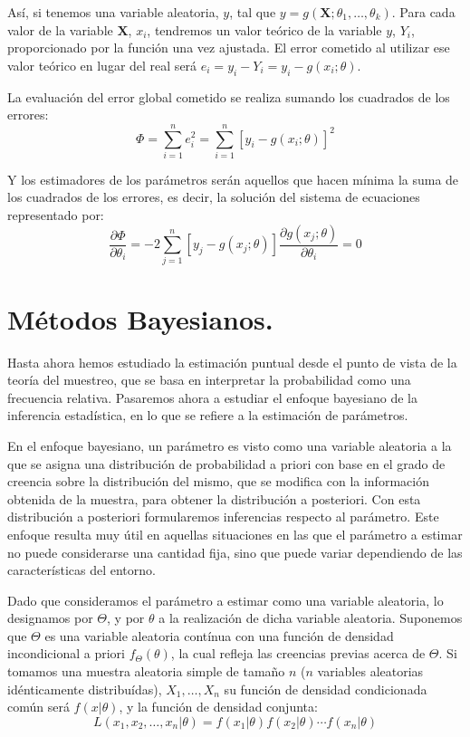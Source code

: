 As\'i, si tenemos una variable aleatoria, $y$, tal que $y=g(\boldsymbol{X};\theta_1,\ldots,\theta_k)$. Para cada valor de la variable $\boldsymbol{X}$, $x_i$, tendremos un valor te\'orico de la variable $y$, $Y_i$, proporcionado por la funci\'on una vez ajustada. El error cometido al utilizar ese valor te\'orico en lugar del real ser\'a $e_i=y_i-Y_i=y_i-g(x_i;\theta)$.

La evaluaci\'on del error global cometido se realiza sumando los cuadrados de los errores:
\begin{equation*}
\Phi=\sum_{i=1}^ne_i^2=\sum_{i=1}^n\left[y_i-g(x_i;\theta)\right]^2
\end{equation*}

Y los estimadores de los par\'ametros ser\'an aquellos que hacen m\'inima la suma de los cuadrados de los errores, es decir, la soluci\'on del sistema de ecuaciones representado por:
\begin{equation*}
\dfrac{\partial\Phi}{\partial\theta_i}=-2\sum_{j=1}^n\left[y_j-g(x_j;\theta)\right]\dfrac{\partial g(x_j;\theta)}{\partial\theta_i}=0
\end{equation*}


\section{M\'etodos Bayesianos.}
Hasta ahora hemos estudiado la estimaci\'on puntual desde el punto de vista de la teor\'ia del muestreo, que se basa en interpretar la probabilidad como una frecuencia relativa. Pasaremos ahora a estudiar el enfoque bayesiano de la inferencia estad\'istica, en lo que se refiere a la estimaci\'on de par\'ametros.

En el enfoque bayesiano, un par\'ametro es visto como una variable aleatoria a la que se asigna una distribuci\'on de probabilidad a priori con base en el grado de creencia sobre la distribuci\'on del mismo, que se modifica con la informaci\'on obtenida de la muestra, para obtener la distribuci\'on a posteriori. Con esta distribuci\'on a posteriori formularemos inferencias respecto al par\'ametro. Este enfoque resulta muy \'util en aquellas situaciones en las que el par\'ametro a estimar no puede considerarse una cantidad fija, sino que puede variar dependiendo de las caracter\'isticas del entorno.

Dado que consideramos el par\'ametro a estimar como una variable aleatoria, lo designamos por $\Theta$, y por $\theta$ a la realizaci\'on de dicha variable aleatoria. Suponemos que $\Theta$ es una variable aleatoria cont\'inua con una funci\'on de densidad incondicional a priori $f_{\Theta}(\theta)$, la cual refleja las creencias previas acerca de $\Theta$. Si tomamos una muestra aleatoria simple de tama\~no $n$ ($n$ variables aleatorias id\'enticamente distribu\'idas), $X_1,\ldots,X_n$ su funci\'on de densidad condicionada com\'un ser\'a $f(x|\theta)$, y la funci\'on de densidad conjunta:
\begin{equation*}
L(x_1,x_2,\ldots,x_n|\theta)=f(x_1|\theta)f(x_2|\theta)\cdots f(x_n|\theta)
\end{equation*}

